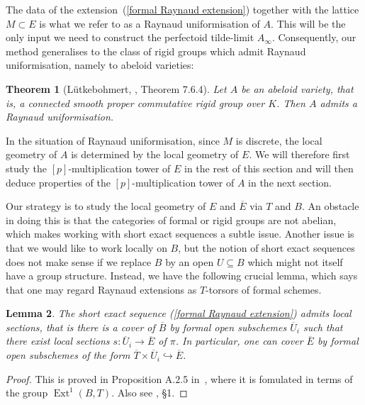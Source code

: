 \documentclass[10pt,oneside]{amsart}
\newtheorem{theorem}{Theorem}[section]
\newtheorem{lemma}[theorem]{Lemma}
\theoremstyle{definition}
\begin{document}
	The data of the extension~(\ref{formal Raynaud extension}) together with the lattice $M\subset E$ is what we refer to as a Raynaud uniformisation of $A$. This will be the only input we need to construct the perfectoid tilde-limit $A_\infty$. Consequently, our method generalises to the class of rigid groups which admit Raynaud uniformisation, namely to abeloid varieties:
	\begin{theorem}[L\"utkebohmert, \cite{Lut}, Theorem 7.6.4]\label{Raynaud uniformisation for abeloids}
		Let $A$ be an abeloid variety, that is, a connected smooth proper commutative rigid group over $K$. Then $A$ admits a Raynaud uniformisation.
	\end{theorem}
	
	In the situation of Raynaud uniformisation, since $M$ is discrete, the local geometry of $A$ is determined by the local geometry of $E$. We will therefore first study the $[p]$-multiplication tower of $E$ in the rest of this section and will then deduce properties of the $[p]$-multiplication tower of $A$ in the next section.

	 Our strategy is to study the local geometry of $E$ and $\overline{E}$ via $T$ and $B$. An obstacle in doing this is that the categories of formal or rigid groups are not abelian, which makes working with short exact sequences a subtle issue. Another issue is that we would like to work locally on $B$, but the notion of short exact sequences does not make sense if we replace $B$ by an open $U\subseteq B$ which might not itself have a group structure.
	Instead, we have the following crucial lemma, which says that one may regard Raynaud extensions as $T$-torsors of formal schemes.

	\begin{lemma}\label{formal Raynaud sequence is locally split}
		The short exact sequence (\ref{formal Raynaud extension}) admits local sections, that is there is a cover of $\overline{B}$ by formal open subschemes $\overline{U}_i$ such that there exist local sections $s:\overline{U}_i\rightarrow \overline{E}$ of $\pi$. In particular, one can cover $\overline{E}$ by formal open subschemes of the form $\overline{T}\times \overline{U}_i\hookrightarrow \overline{E}$.
	\end{lemma}
	\begin{proof}
		This is proved in Proposition A.2.5 in~\cite{Lut}, where it is fomulated in terms of the group $\operatorname{Ext}^1(B,T)$. Also see \cite{BL}, \S 1.
	\end{proof}
\end{document}
